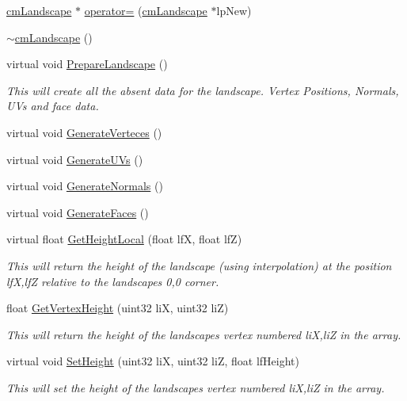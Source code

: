 \begin{DoxyCompactItemize}
\hyperlink{classcm_landscape}{cmLandscape} $\ast$ \hyperlink{classcm_landscape_a733c070d034728e298b0f56e69b76e86}{operator=} (\hyperlink{classcm_landscape}{cmLandscape} $\ast$lpNew)
\item 
\hyperlink{classcm_landscape_a9cf1dcde9676ab1a51376568a707daf6}{$\sim$cmLandscape} ()
\item 
virtual void \hyperlink{classcm_landscape_a5ed79e3065ea2efebc8c34e1bd5786a0}{PrepareLandscape} ()
\begin{DoxyCompactList}\small\item\em This will create all the absent data for the landscape. Vertex Positions, Normals, UVs and face data. \item\end{DoxyCompactList}\item 
virtual void \hyperlink{classcm_landscape_a03ec6fbfc57be4c252c3e0df1f1512fa}{GenerateVerteces} ()
\item 
virtual void \hyperlink{classcm_landscape_ad9e30a79fff2a756e7e560acd4435ca7}{GenerateUVs} ()
\item 
virtual void \hyperlink{classcm_landscape_a5afe57456c86358d91a514453c7fd179}{GenerateNormals} ()
\item 
virtual void \hyperlink{classcm_landscape_a04e954c2c362d72543f6c8e76653c04d}{GenerateFaces} ()
\item 
virtual float \hyperlink{classcm_landscape_a69992ba6344d84b1bd3d969befb7004e}{GetHeightLocal} (float lfX, float lfZ)
\begin{DoxyCompactList}\small\item\em This will return the height of the landscape (using interpolation) at the position lfX,lfZ relative to the landscapes 0,0 corner. \item\end{DoxyCompactList}\item 
float \hyperlink{classcm_landscape_af7ad1920fc8458d4c88c062df87325dd}{GetVertexHeight} (uint32 liX, uint32 liZ)
\begin{DoxyCompactList}\small\item\em This will return the height of the landscapes vertex numbered liX,liZ in the array. \item\end{DoxyCompactList}\item 
virtual void \hyperlink{classcm_landscape_aee7f2aa4548d58a1f51aacb7eb4ed4d4}{SetHeight} (uint32 liX, uint32 liZ, float lfHeight)
\begin{DoxyCompactList}\small\item\em This will set the height of the landscapes vertex numbered liX,liZ in the array. \item\end{DoxyCompactList}\item 

\end{DoxyCompactItemize}
